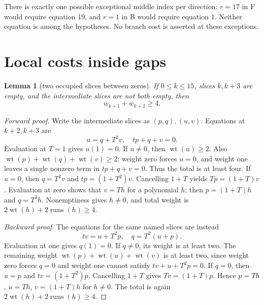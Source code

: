 \documentclass{article}
\newtheorem{lemma}{Lemma}
\DeclareMathOperator{\wt}{wt}
\DeclareMathOperator{\runs}{runs}
\begin{document}
There is exactly one possible exceptional middle index per direction: \(r = 17\) in F would
require equation 19, and \(r = 1\) in B would require equation 1. Neither equation is among the
hypotheses. No branch cost is asserted at these exceptions.

\section{Local costs inside gaps}\label{sec:gaps}

\begin{lemma}[two occupied slices between zeros]\label{lem:two}
  If \(0 \le k \le 15\), slices \(k, k + 3\) are empty, and the intermediate slices are not both
  empty, then
  \begin{equation}
    w_{k+1} + w_{k+2} \ge 4.
  \end{equation}
\end{lemma}

\begin{proof}[Forward proof]
  Write the intermediate slices as \((p,q), (u,v)\). Equations at \(k + 2, k + 3\) are
  \begin{equation}
    u = q + T^2 v, \quad tp + q + v = 0.
  \end{equation}
  Evaluation at \(T = 1\) gives \(u(1) = 0\). If \(u \ne 0\), then \(\wt(u) \ge 2\). Also
  \(\wt(p) + \wt(q) + \wt(v) \ge 2\): weight zero forces \(u = 0\), and weight one leaves a
  single nonzero term in \(tp + q + v = 0\). Thus the total is at least four. If \(u = 0\), then
  \(q = T^2 v\) and \(tp = (1 + T^2) v\). Cancelling \(1 + T\) yields \(Tp = (1 + T) v\).
  Evaluation at zero shows that \(v = Th\) for a polynomial \(h\); then \(p = (1 + T) h\) and
  \(q = T^3 h\). Nonemptiness gives \(h \ne 0\), and total weight is
  \(2\wt(h) + 2\runs(h) \ge 4\).

  \emph{Backward proof.} The equations for the same named slices are instead
  \begin{equation}
    tv = u + T^2 p, \quad q = T^2 (u + p).
  \end{equation}
  Evaluation at one gives \(q(1) = 0\). If \(q \ne 0\), its weight is at least two. The remaining
  weight \(\wt(p) + \wt(u) + \wt(v)\) is at least two, since weight zero forces \(q = 0\) and
  weight one cannot satisfy \(tv + u + T^2 p = 0\). If \(q = 0\), then \(u = p\) and
  \(tv = (1 + T^2) p\). Cancelling \(1 + T\) gives \(Tv = (1 + T) p\). Hence \(p = Th\),
  \(u = Th\), \(v = (1 + T) h\) for \(h \ne 0\). The total is again
  \(2\wt(h) + 2\runs(h) \ge 4\).
\end{proof}
\end{document}
